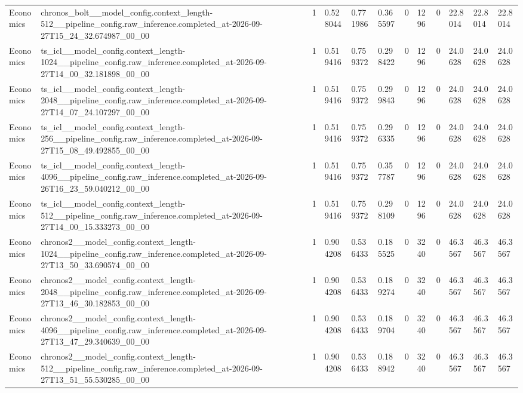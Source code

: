 \begin{tabular}{llllllllllll}
Economics & chronos\_bolt\_\_model\_config.context\_length-512\_\_pipeline\_config.raw\_inference.completed\_at-2026-09-27T15\_24\_32.674987\_00\_00 & 1 & 0.528044 & 0.771986 & 0.365597 & 0 & 1296 & 0 & 22.8014 & 22.8014 & 22.8014 \\
Economics & ts\_icl\_\_model\_config.context\_length-1024\_\_pipeline\_config.raw\_inference.completed\_at-2026-09-27T14\_00\_32.181898\_00\_00 & 1 & 0.519416 & 0.759372 & 0.298422 & 0 & 1296 & 0 & 24.0628 & 24.0628 & 24.0628 \\
Economics & ts\_icl\_\_model\_config.context\_length-2048\_\_pipeline\_config.raw\_inference.completed\_at-2026-09-27T14\_07\_24.107297\_00\_00 & 1 & 0.519416 & 0.759372 & 0.299843 & 0 & 1296 & 0 & 24.0628 & 24.0628 & 24.0628 \\
Economics & ts\_icl\_\_model\_config.context\_length-256\_\_pipeline\_config.raw\_inference.completed\_at-2026-09-27T15\_08\_49.492855\_00\_00 & 1 & 0.519416 & 0.759372 & 0.296335 & 0 & 1296 & 0 & 24.0628 & 24.0628 & 24.0628 \\
Economics & ts\_icl\_\_model\_config.context\_length-4096\_\_pipeline\_config.raw\_inference.completed\_at-2026-09-26T16\_23\_59.040212\_00\_00 & 1 & 0.519416 & 0.759372 & 0.357787 & 0 & 1296 & 0 & 24.0628 & 24.0628 & 24.0628 \\
Economics & ts\_icl\_\_model\_config.context\_length-512\_\_pipeline\_config.raw\_inference.completed\_at-2026-09-27T14\_00\_15.333273\_00\_00 & 1 & 0.519416 & 0.759372 & 0.298109 & 0 & 1296 & 0 & 24.0628 & 24.0628 & 24.0628 \\
Economics & chronos2\_\_model\_config.context\_length-1024\_\_pipeline\_config.raw\_inference.completed\_at-2026-09-27T13\_50\_33.690574\_00\_00 & 1 & 0.904208 & 0.536433 & 0.185525 & 0 & 3240 & 0 & 46.3567 & 46.3567 & 46.3567 \\
Economics & chronos2\_\_model\_config.context\_length-2048\_\_pipeline\_config.raw\_inference.completed\_at-2026-09-27T13\_46\_30.182853\_00\_00 & 1 & 0.904208 & 0.536433 & 0.189274 & 0 & 3240 & 0 & 46.3567 & 46.3567 & 46.3567 \\
Economics & chronos2\_\_model\_config.context\_length-4096\_\_pipeline\_config.raw\_inference.completed\_at-2026-09-27T13\_47\_29.340639\_00\_00 & 1 & 0.904208 & 0.536433 & 0.189704 & 0 & 3240 & 0 & 46.3567 & 46.3567 & 46.3567 \\
Economics & chronos2\_\_model\_config.context\_length-512\_\_pipeline\_config.raw\_inference.completed\_at-2026-09-27T13\_51\_55.530285\_00\_00 & 1 & 0.904208 & 0.536433 & 0.188942 & 0 & 3240 & 0 & 46.3567 & 46.3567 & 46.3567 \\

\end{tabular}
